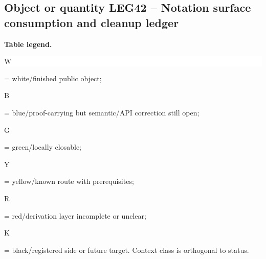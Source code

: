\subsection*{Object or quantity LEG42 -- Notation surface consumption and cleanup ledger}
\hypertarget{objproof:LEG42}{}
\par\smallskip\noindent\begin{minipage}{0.99\linewidth}\footnotesize\raggedright\textbf{Table legend.} \colorbox{white}{\strut W} = white/finished public object; \colorbox{cyan!20}{\strut B} = blue/proof-carrying but semantic/API correction still open; \colorbox{green!18}{\strut G} = green/locally closable; \colorbox{yellow!25}{\strut Y} = yellow/known route with prerequisites; \colorbox{red!20}{\strut R} = red/derivation layer incomplete or unclear; \colorbox{black!18}{\strut K} = black/registered side or future target. Context class is orthogonal to status.\end{minipage}\par\vspace{0.25em}
